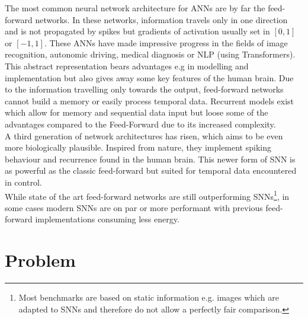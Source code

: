 The most common neural network architecture for \acp{ANN} are by far the feed-forward networks.
In these networks, information travels only in one direction and is not propagated by spikes but gradients of activation usually set in $[0,1]$ or $[-1,1]$.
These \acp{ANN} have made impressive progress in the fields of image recognition, autonomic driving, medical diagnosis\cite{patel_applications_2007} or  \ac{NLP} (using Transformers\cite{vaswani_attention_2017}).\\
This abstract representation bears advantages e.g in modelling and implementation but also gives away some key features of the human brain. Due to the information travelling only towards the output, feed-forward networks cannot build a memory or easily process temporal data. Recurrent models exist which allow for memory \cite{hutchison_biologically_2004} and sequential data input but loose some of the advantages compared to the Feed-Forward due to its increased complexity.\\
A third generation\cite{maass_networks_1997} of network architectures has risen, which aims to be even more biologically plausible. Inspired from nature, they implement spiking behaviour and recurrence found in the human brain.
This newer form of \ac{SNN} is as powerful as the classic feed-forward but suited for temporal data encountered in control.\\
While state of the art feed-forward networks are still outperforming \acp{SNN}\footnote{Most benchmarks are based on static information e.g. images which are adapted to \acp{SNN} and therefore do not allow a perfectly fair comparison.}, in some cases modern \acp{SNN} are on par\cite{lee_training_2016} or more performant with previous feed-forward implementations consuming less energy.

%

\section{Problem}





